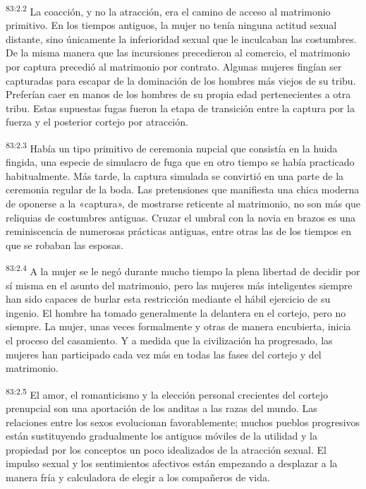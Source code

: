 \par
\textsuperscript{83:2.2} La coacción, y no la atracción, era el camino de acceso al matrimonio primitivo. En los tiempos antiguos, la mujer no tenía ninguna actitud sexual distante, sino únicamente la inferioridad sexual que le inculcaban las costumbres. De la misma manera que las incursiones precedieron al comercio, el matrimonio por captura precedió al matrimonio por contrato. Algunas mujeres fingían ser capturadas para escapar de la dominación de los hombres más viejos de su tribu. Preferían caer en manos de los hombres de su propia edad pertenecientes a otra tribu. Estas supuestas fugas fueron la etapa de transición entre la captura por la fuerza y el posterior cortejo por atracción.

\par
\textsuperscript{83:2.3} Había un tipo primitivo de ceremonia nupcial que consistía en la huida fingida, una especie de simulacro de fuga que en otro tiempo se había practicado habitualmente. Más tarde, la captura simulada se convirtió en una parte de la ceremonia regular de la boda. Las pretensiones que manifiesta una chica moderna de oponerse a la «captura», de mostrarse reticente al matrimonio, no son más que reliquias de costumbres antiguas. Cruzar el umbral con la novia en brazos es una reminiscencia de numerosas prácticas antiguas, entre otras las de los tiempos en que se robaban las esposas.

\par
\textsuperscript{83:2.4} A la mujer se le negó durante mucho tiempo la plena libertad de decidir por sí misma en el asunto del matrimonio, pero las mujeres más inteligentes siempre han sido capaces de burlar esta restricción mediante el hábil ejercicio de su ingenio. El hombre ha tomado generalmente la delantera en el cortejo, pero no siempre. La mujer, unas veces formalmente y otras de manera encubierta, inicia el proceso del casamiento. Y a medida que la civilización ha progresado, las mujeres han participado cada vez más en todas las fases del cortejo y del matrimonio.

\par
\textsuperscript{83:2.5} El amor, el romanticismo y la elección personal crecientes del cortejo prenupcial son una aportación de los anditas a las razas del mundo. Las relaciones entre los sexos evolucionan favorablemente; muchos pueblos progresivos están sustituyendo gradualmente los antiguos móviles de la utilidad y la propiedad por los conceptos un poco idealizados de la atracción sexual. El impulso sexual y los sentimientos afectivos están empezando a desplazar a la manera fría y calculadora de elegir a los compañeros de vida.

